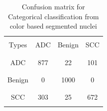 \documentclass[conference]{IEEEtran}
\begin{document}
\begin{table}
\begin{center}
\begin{tabular}[scale=1.3]{ | c | c | c | c |}
  \hline        
   &  & &\\
   Types & ADC  & Benign & SCC  \\
    &  & &\\
    \hline        
   &  & &\\
   ADC & 877  & 22 & 101 \\
   & & &\\
   \hline
   & & &\\
   Benign & 0 & 1000 & 0 \\
   & & &\\
   \hline
   & & &\\
   SCC & 303 & 25 & 672 \\
   &  & & \\
  
  \hline  
\end{tabular}
\caption{Confusion matrix for Categorical classification from color based segmented nuclei}
\label{table6}
\end{center}
\end{table}
\end{document}
